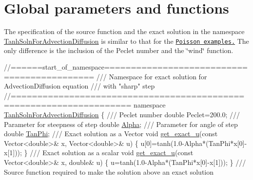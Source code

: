  

\hypertarget{index_global}{}\section{Global parameters and functions}\label{index_global}
The specification of the source function and the exact solution in the namespace {\ttfamily \hyperlink{namespaceTanhSolnForAdvectionDiffusion}{Tanh\+Soln\+For\+Advection\+Diffusion}} is similar to that for the \href{../../../poisson/two_d_poisson/html/index.html#global}{\tt Poisson examples.} The only difference is the inclusion of the Peclet number and the \char`\"{}wind\char`\"{} function.

 
\begin{DoxyCodeInclude}
\textcolor{comment}{//======start\_of\_namespace============================================}
\textcolor{comment}{/// Namespace for exact solution for AdvectionDiffusion equation }
\textcolor{comment}{}\textcolor{comment}{/// with "sharp" step }
\textcolor{comment}{}\textcolor{comment}{//====================================================================}
\textcolor{keyword}{namespace }\hyperlink{namespaceTanhSolnForAdvectionDiffusion}{TanhSolnForAdvectionDiffusion}
\{
\textcolor{comment}{}
\textcolor{comment}{ /// Peclet number}
\textcolor{comment}{} \textcolor{keywordtype}{double} Peclet=200.0;
\textcolor{comment}{}
\textcolor{comment}{ /// Parameter for steepness of step}
\textcolor{comment}{} \textcolor{keywordtype}{double} \hyperlink{namespaceTanhSolnForAdvectionDiffusion_a4d202e8ac48cc75f760ef40681402ec7}{Alpha};
\textcolor{comment}{}
\textcolor{comment}{ /// Parameter for angle of step}
\textcolor{comment}{} \textcolor{keywordtype}{double} \hyperlink{namespaceTanhSolnForAdvectionDiffusion_a236bf82c661189623706b7c9d9b0c52f}{TanPhi};
\textcolor{comment}{}
\textcolor{comment}{ /// Exact solution as a Vector}
\textcolor{comment}{} \textcolor{keywordtype}{void} \hyperlink{namespaceTanhSolnForAdvectionDiffusion_ae4c9ed0a4f123ec8e634f0cc45bfcebc}{get\_exact\_u}(\textcolor{keyword}{const} Vector<double>& x, Vector<double>& u)
 \{
  u[0]=tanh(1.0-Alpha*(TanPhi*x[0]-x[1]));
 \}
\textcolor{comment}{}
\textcolor{comment}{ /// Exact solution as a scalar}
\textcolor{comment}{} \textcolor{keywordtype}{void} \hyperlink{namespaceTanhSolnForAdvectionDiffusion_ae4c9ed0a4f123ec8e634f0cc45bfcebc}{get\_exact\_u}(\textcolor{keyword}{const} Vector<double>& x, \textcolor{keywordtype}{double}& u)
 \{
  u=tanh(1.0-Alpha*(TanPhi*x[0]-x[1]));
 \}
\textcolor{comment}{}
\textcolor{comment}{ /// Source function required to make the solution above an exact solution }

\end{DoxyCodeInclude}
